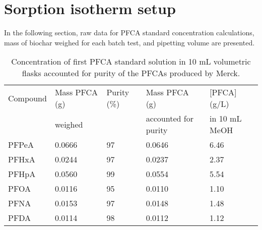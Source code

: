 \chapter{Sorption isotherm setup}\label{appSec:IsothermSetup}
In the following section, raw data for PFCA standard concentration calculations, mass of biochar weighed for each batch test, and pipetting volume are presented.

\begin{table}[h]
\centering
\caption{Concentration of first PFCA standard solution in 10 mL volumetric flasks accounted for purity of the PFCAs produced by Merck.}
\label{appTab:purityMass}
\begin{tabular}{lllll}
\toprule
Compound & Mass PFCA (g) & Purity (\%) & Mass PFCA (g) & {[}PFCA{]} (g/L) \\ 
& weighed & & accounted for purity & in   10 mL MeOH \\ \midrule
PFPeA & 0.0666 & 97 & 0.0646 & 6.46 \\
PFHxA & 0.0244 & 97 & 0.0237 & 2.37 \\
PFHpA & 0.0560 & 99 & 0.0554 & 5.54 \\
PFOA & 0.0116 & 95 & 0.0110 & 1.10 \\
PFNA & 0.0153 & 97 & 0.0148 & 1.48 \\
PFDA & 0.0114 & 98 & 0.0112 & 1.12 \\ \bottomrule
\end{tabular}
\end{table}

\begin{table}
\centering
\caption{Expected concentration of PFCA standards based on weight of native PFCA and dilution calculations versus analytical concentration by LC-MS/MS.}
\label{appTab:expConc}
\end{table}

